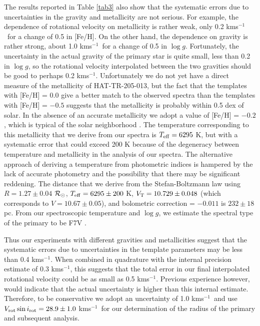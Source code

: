 \documentclass[12pt, preprint]{aastex}
\newcommand\kms{\ifmmode{\rm km\thinspace s^{-1}}\else km\thinspace s$^{-1}$\fi}
\newcommand\rsun{\ifmmode{{\cal R}_{\odot}}\else ${\cal R}_{\odot}$\fi}
\begin{document}
The results reported in Table \ref{tab3} also show that the systematic
errors due to uncertainties in the gravity and metallicity are not
serious. For example, the dependence of rotational velocity on
metallicity is rather weak, only 0.2 \kms\ for a change of 0.5 in
[Fe/H]. On the other hand, the dependence on gravity is rather
strong, about 1.0 \kms\ for a change of 0.5 in $\log g$. Fortunately,
the uncertainty in the actual gravity of the primary star is quite
small, less than 0.2 in $\log g$, so the rotational velocity
interpolated between the two gravities should be good to perhaps 0.2
\kms. Unfortunately we do not yet have a direct measure of the
metallicity of HAT-TR-205-013, but the fact that the templates with
[Fe/H] = 0.0 give a better match to the observed spectra than the
templates with [Fe/H] = $-0.5$ suggests that the metallicity is
probably within 0.5 dex of solar.  In the absence of an accurate
metallicity we adopt a value of [Fe/H] = $-0.2$, which is typical of
the solar neighborhood \citep{Nordstrom2004}. The temperature
corresponding to this metallicity that we derive from our spectra
is $T_{\rm eff} = 6295$ K, but with a systematic error that could
exceed 200 K because of the degeneracy between temperature and
metallicity in the analysis of our spectra. The alternative approach
of deriving a temperature from photometric indices is hampered by the
lack of accurate photometry and the possibility that there may be
significant reddening. The distance that we derive from the
Stefan-Boltzmann law using $R=1.27 \pm 0.04$ \rsun, $T_{\rm eff} = 6295
\pm 200$ K, $V_{\rm T} = 10.729 \pm 0.048$ (which corresponds to $V = 10.67 \pm 0.05$), and bolometric correction =
$-0.011$ \citep{flower1996} is $232 \pm 18$ pc. From our spectroscopic temperature and $\log g$, we estimate the spectral type of the primary to be F7V \citep{cox2000}.

Thus our experiments with different gravities and metallicities
suggest that the systematic errors due to uncertainties in the
template parameters may be less than 0.4 \kms. When combined in
quadrature with the internal precision estimate of 0.3 \kms, this
suggests that the total error in our final interpolated rotational
velocity could be as small as 0.5 \kms. Previous experience however, would indicate that the actual uncertainty is higher than this internal estimate. Therefore, to be conservative we adopt
an uncertainty of 1.0 \kms\ and use $V_{\rm rot} \sin i_{\rm rot} =
28.9 \pm 1.0$ \kms\ for our determination of the radius of the primary
and subsequent analysis.
\end{document}
